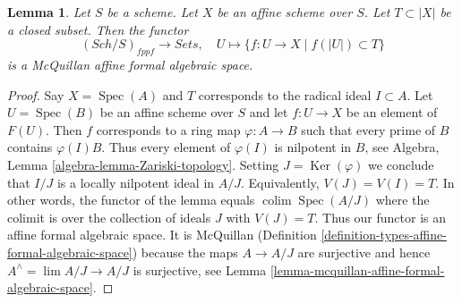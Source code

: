 \documentclass{stacks-project}
\theoremstyle{plain}
\newtheorem{lemma}[subsection]{Lemma}
\theoremstyle{definition}
\theoremstyle{remark}
\numberwithin{equation}{subsection}
\def\lim{\mathop{\mathrm{lim}}\nolimits}
\def\colim{\mathop{\mathrm{colim}}\nolimits}
\def\Spec{\mathop{\mathrm{Spec}}}
\def\Sch{\mathit{Sch}}
\def\Ker{\mathop{\mathrm{Ker}}}
\begin{document}
\begin{lemma}
\label{lemma-completion-affine-is-affine-formal-algebraic-space}
Let $S$ be a scheme. Let $X$ be an affine scheme over $S$.
Let $T \subset |X|$ be a closed subset. Then the functor
$$
(\Sch/S)_{fppf} \longrightarrow \textit{Sets},\quad
U \longmapsto \{f : U \to X \mid f(|U|) \subset T\}
$$
is a McQuillan affine formal algebraic space.
\end{lemma}

\begin{proof}
Say $X = \Spec(A)$ and $T$ corresponds to the radical ideal $I \subset A$.
Let $U = \Spec(B)$ be an affine scheme over $S$ and let
$f : U \to X$ be an element of $F(U)$. Then $f$ corresponds to a
ring map $\varphi : A \to B$ such that every prime of $B$ contains
$\varphi(I) B$. Thus every element of $\varphi(I)$ is nilpotent in $B$, see
Algebra, Lemma \ref{algebra-lemma-Zariski-topology}.
Setting $J = \Ker(\varphi)$ we conclude that $I/J$ is a locally nilpotent
ideal in $A/J$. Equivalently, $V(J) = V(I) = T$.
In other words, the functor of the lemma equals
$\colim \Spec(A/J)$ where the colimit is over the
collection of ideals $J$ with $V(J) = T$.
Thus our functor is an affine formal algebraic space. It is McQuillan
(Definition \ref{definition-types-affine-formal-algebraic-space})
because the maps $A \to A/J$ are surjective
and hence $A^\wedge = \lim A/J \to A/J$ is surjective, see
Lemma \ref{lemma-mcquillan-affine-formal-algebraic-space}.
\end{proof}
\end{document}
